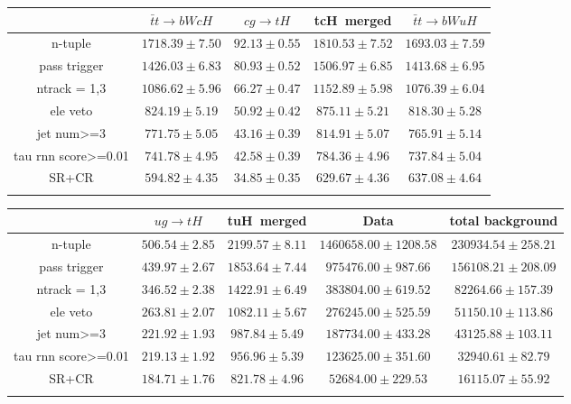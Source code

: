 \begin{tabular}{ccccc} \toprule\toprule
 & $\bar{t}t\to bWcH$ & $cg\to tH$ & tcH~merged & $\bar{t}t\to bWuH$\\\midrule
n-tuple & $1718.39\pm7.50$ & $92.13\pm0.55$ & $1810.53\pm7.52$ & $1693.03\pm7.59$\\
pass trigger & $1426.03\pm6.83$ & $80.93\pm0.52$ & $1506.97\pm6.85$ & $1413.68\pm6.95$\\
ntrack = 1,3 & $1086.62\pm5.96$ & $66.27\pm0.47$ & $1152.89\pm5.98$ & $1076.39\pm6.04$\\
ele veto & $824.19\pm5.19$ & $50.92\pm0.42$ & $875.11\pm5.21$ & $818.30\pm5.28$\\
jet num>=3 & $771.75\pm5.05$ & $43.16\pm0.39$ & $814.91\pm5.07$ & $765.91\pm5.14$\\
tau rnn score>=0.01 & $741.78\pm4.95$ & $42.58\pm0.39$ & $784.36\pm4.96$ & $737.84\pm5.04$\\
SR+CR & $594.82\pm4.35$ & $34.85\pm0.35$ & $629.67\pm4.36$ & $637.08\pm4.64$\\
\bottomrule\bottomrule\\
\end{tabular}
\begin{tabular}{ccccc} \toprule\toprule
 & $ug\to tH$ & tuH~merged & Data & total background\\\midrule
n-tuple & $506.54\pm2.85$ & $2199.57\pm8.11$ & $1460658.00\pm1208.58$ & $230934.54\pm258.21$\\
pass trigger & $439.97\pm2.67$ & $1853.64\pm7.44$ & $975476.00\pm987.66$ & $156108.21\pm208.09$\\
ntrack = 1,3 & $346.52\pm2.38$ & $1422.91\pm6.49$ & $383804.00\pm619.52$ & $82264.66\pm157.39$\\
ele veto & $263.81\pm2.07$ & $1082.11\pm5.67$ & $276245.00\pm525.59$ & $51150.10\pm113.86$\\
jet num>=3 & $221.92\pm1.93$ & $987.84\pm5.49$ & $187734.00\pm433.28$ & $43125.88\pm103.11$\\
tau rnn score>=0.01 & $219.13\pm1.92$ & $956.96\pm5.39$ & $123625.00\pm351.60$ & $32940.61\pm82.79$\\
SR+CR & $184.71\pm1.76$ & $821.78\pm4.96$ & $52684.00\pm229.53$ & $16115.07\pm55.92$\\
\bottomrule\bottomrule\\
\end{tabular}
